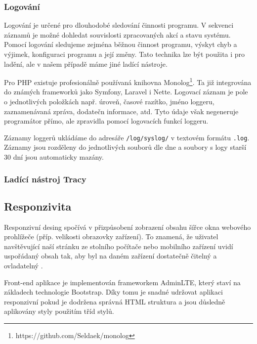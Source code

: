 \documentclass[czech,BP]{thesiskiv}
\begin{document}
		\subsubsection{Logování}
		\par Logování je určené pro dlouhodobé sledování činnosti programu. V sekvenci záznamů je možné dohledat souvislosti zpracovaných akcí a stavu systému. Pomocí logování sledujeme zejména běžnou činnost programu, výskyt chyb a výjimek, konfiguraci programu a její změny. Tato technika lze být použita i pro ladění, ale v našem případě máme jiné ladící nástroje.
		\par Pro PHP existuje profesionálně používaná knihovna Monolog\footnote{https://github.com/Seldaek/monolog}. Ta již integrována do známých frameworků jako Symfony, Laravel i Nette. Logovací záznam je pole o jednotlivých položkách např. úroveň, časové razítko, jméno loggeru, zaznamenávaná zpráva, dodatečn informace, atd. Tyto údaje však negeneruje programátor přímo, ale zpravidla pomocí logovacích funkcí loggeru.
		\par Záznamy loggerů ukládáme do adresáře \texttt{/log/syslog/} v textovém formátu \texttt{.log}. Záznamy jsou rozděleny do jednotlivých souborů dle dne a soubory s logy starší 30 dní jsou automaticky mazány.
		\subsubsection{Ladící nástroj Tracy}
		
		\subsection{Responzivita}
		\par Responzivní desing spočívá v přizpůsobení zobrazení obsahu šířce okna webového prohlížeče (příp. velikosti obrazovky zařízení). To znamená, že uživatel navštěvující naší stránku ze stolního počítače nebo mobilního zařízení uvidí uspořádaný obsah tak, aby byl na daném zařízení dostatečně čitelný a ovladatelný \cite{CSSOkamzite}.
		\par Front-end aplikace je implementován frameworkem AdminLTE, který staví na základech technologie Bootstrap. Díky tomu je snadné udržovat aplikaci responzivní pokud je dodržena správná HTML struktura a jsou důsledně aplikovány styly použitím tříd stylů.
			
\end{document}

